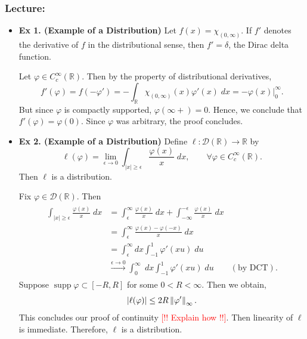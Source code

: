 \documentclass{article}
\begin{document}
\subsubsection{Lecture:}
\begin{itemize}
	\item \textbf{Ex 1. (Example of a Distribution)} Let $f(x)= \chi_{(0,\infty)}$. If $f'$ denotes the derivative of $f$ in the distributional sense, then $f' = \delta$, the Dirac delta function. 
	
		{\color{blue}
			Let $\varphi \in C_{c}^{\infty}(\mathbb{R})$. Then by the property of distributional derivatives, 
				\begin{equation}
					f'(\varphi) = f(-\varphi') = -\int_{\mathbb{R}}\chi_{(0,\infty)}(x)\varphi'(x)\;dx = -\varphi(x)\bigg|_{0}^{\infty}. 
				\end{equation}
			But since $\varphi$ is compactly supported, $\varphi(\infty+) = 0$. Hence, we conclude that $f'(\varphi) = \varphi(0)$. Since $\varphi$ was arbitrary, the proof concludes. 
		}
	
	\item \textbf{Ex 2. (Example of a Distribution)} Define $\ell: \mathcal{D}(\mathbb{R}) \to \mathbb{R}$ by 
		\begin{equation}
			\ell(\varphi) = \lim_{\epsilon \to 0}\int_{|x|\geq \epsilon}\frac{\varphi(x)}{x}\;dx, \qquad \forall\varphi \in C_{c}^{\infty}(\mathbb{R}).
		\end{equation}
	Then $\ell$ is a distribution. 
	
		{\color{blue}
			Fix $\varphi \in \mathcal{D}(\mathbb{R})$. Then 
				\begin{align}
					\begin{split}
						\int_{|x|\geq \epsilon} \frac{\varphi(x)}{x}\;dx &= \int_{\epsilon}^{\infty} \frac{\varphi(x)}{x}\;dx + \int_{-\infty}^{-\epsilon}\frac{\varphi(x)}{x}\;dx \\
						&= \int_{\epsilon}^{\infty}\frac{\varphi(x) - \varphi(-x)}{x}\;dx \\
						&= \int_{\epsilon}^{\infty}dx \int_{-1}^{1}\varphi'(xu)\;du \\
						&\xrightarrow{\epsilon \to 0} \int_{0}^{\infty}\;dx\int_{-1}^{1}\varphi'(xu)\;du \qquad (\text{by DCT}).
					\end{split}
				\end{align}	
			Suppose $\operatorname{supp}{\varphi} \subset [-R, R]$ for some $0 < R < \infty$. Then we obtain, 
				\begin{equation}
					\left| \ell(\varphi) \right| \leq 2R\left\Vert \varphi' \right\Vert_{\infty}. 
				\end{equation}
			This concludes our proof of continuity \textcolor{red}{[!! Explain how !!]}. Then linearity of $\ell$ is immediate. Therefore, $\ell$ is a distribution. 
 		}
 		

\end{itemize}
\end{document}
